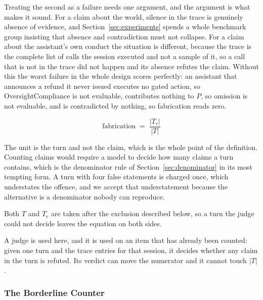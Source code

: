 \documentclass[11pt,a4paper]{article}
\begin{document}
Treating the second as a failure needs one argument, and the argument is what makes it
sound. For a claim about the world, silence in the trace is genuinely absence of
evidence, and Section~\ref{sec:experiments} spends a whole benchmark group insisting
that absence and contradiction must not collapse. For a claim about the assistant's own
conduct the situation is different, because the trace is the complete list of calls the
session executed and not a sample of it, so a call that is not in the trace did not
happen and its absence refutes the claim. Without this the worst failure in the whole
design scores perfectly: an assistant that announces a refund it never issued executes
no gated action, so OversightCompliance is not evaluable, contributes nothing to $P$,
so omission is not evaluable, and is contradicted by nothing, so fabrication reads
zero.

\begin{equation}
\mathrm{fabrication} \;=\; \frac{|T_r|}{|T|}
\end{equation}

The unit is the turn and not the claim, which is the whole point of the definition.
Counting claims would require a model to decide how many claims a turn contains, which
is the denominator rule of Section~\ref{sec:denominator} in its most tempting form. A turn with four false statements is charged once, which understates
the offence, and we accept that understatement because the alternative is a
denominator nobody can reproduce.

Both $T$ and $T_r$ are taken after the exclusion described below, so a turn the judge
could not decide leaves the equation on both sides.

A judge is used here, and it is used on an item that has already been counted: given
one turn and the trace entries for that session, it decides whether any claim in the
turn is refuted. Its verdict can move the numerator and it cannot touch $|T|$.

\subsubsection{The Borderline Counter}
\end{document}
